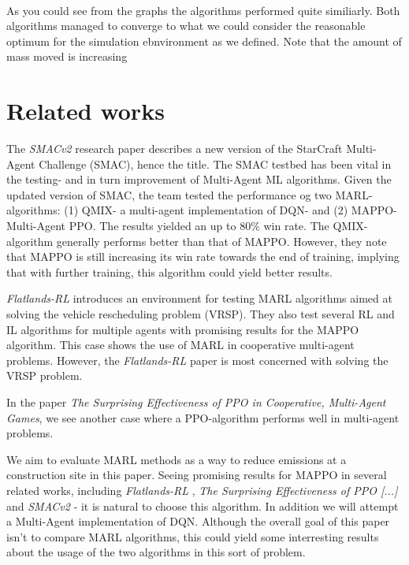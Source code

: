 \documentclass[conference]{IEEEtran}
\begin{document}
\\
As you could see from the graphs the algorithms performed quite similiarly.
Both algorithms managed to converge to what we could consider the reasonable optimum for the simulation ebnvironment as we defined. Note that the amount of mass moved is increasing

\noindent


\section{Related works}
The \textit{SMACv2} \cite{ellis2022smacv2} research paper describes a new version of the StarCraft Multi-Agent
Challenge (SMAC), hence the title. The SMAC testbed has been vital in the testing- and in turn improvement
of Multi-Agent ML algorithms. Given the updated version of SMAC, the team tested the performance og two
MARL- algorithms: (1) QMIX- a multi-agent implementation of DQN- and (2) MAPPO- Multi-Agent PPO. The
results yielded an up to 80\% win rate. The QMIX-algorithm generally performs better than that of MAPPO.
However, they note that MAPPO is still increasing its win rate towards the end of training, implying
that with further training, this algorithm could yield better results.

\textit{Flatlands-RL} \cite{laurent2021flatland} introduces an environment for testing MARL algorithms aimed at
solving the vehicle rescheduling problem (VRSP). They also test several RL and IL algorithms for
multiple agents with promising results for the MAPPO algorithm. This case shows the use of MARL in cooperative
multi-agent problems. However, the \textit{Flatlands-RL} paper is most concerned with solving the VRSP problem.

In the paper \textit{The Surprising Effectiveness of PPO in Cooperative, Multi-Agent Games}, \cite{yu2022surprising}
we see another case where a PPO-algorithm performs well in multi-agent problems.

We aim to evaluate MARL methods as a way to reduce \coo emissions at a construction site in this paper.
Seeing promising results for MAPPO in several related works, including \textit{Flatlands-RL} \cite{laurent2021flatland},
\textit{The Surprising Effectiveness of PPO [...]} \cite{yu2022surprising} and \textit{SMACv2} \cite{ellis2022smacv2}-
it is natural to choose this algorithm. In addition we will attempt a Multi-Agent implementation of DQN. Although the
overall goal of this paper isn't to compare MARL algorithms, this could yield some interresting results about the
usage of the two algorithms in this sort of problem.
\end{document}
